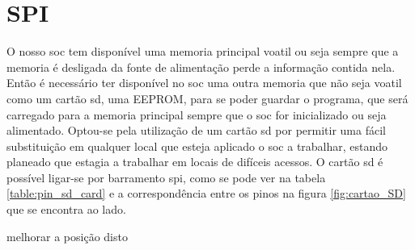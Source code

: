 
\chapter{SPI}
\label{chapter:spi}

O nosso \acrshort{soc} tem disponível uma memoria principal voatil ou seja sempre que a memoria é desligada da fonte de alimentação perde a informação contida nela. Então é necessário ter disponível no \acrshort{soc} uma outra memoria que não seja voatil como um cartão \acrlong{sd}, uma EEPROM, para se poder guardar o programa, que será carregado para a memoria principal sempre que o \acrshort{soc} for inicializado ou seja alimentado. Optou-se pela utilização de um cartão \acrshort{sd} por permitir uma fácil substituição em qualquer local que esteja aplicado o \acrshort{soc} a trabalhar, estando planeado que estagia a trabalhar em locais de difíceis acessos. O cartão \acrshort{sd} é possível ligar-se por barramento \acrshort{spi}, como se pode ver na tabela \ref{table:pin_sd_card} e a correspondência entre os pinos na figura \ref{fig:cartao_SD} que se encontra ao lado.

\textcolor[rgb]{1,0,0}{melhorar a posição disto}

